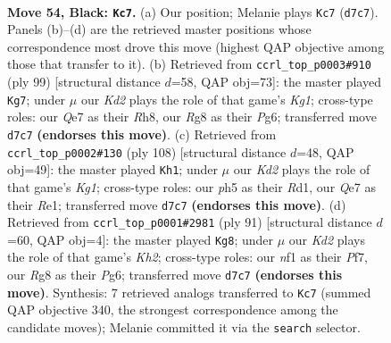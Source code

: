 \documentclass[11pt]{article}
\begin{document}
\clearpage

\begin{figure}[p]\centering
\begin{subfigure}{0.46\textwidth}\centering
\resizebox{\linewidth}{!}{%
\newchessgame
\chessboard[
  setfen={r5r1/p2kq1p1/7p/3p1Q1P/p2P2P1/4P3/7K/4bN2 b - - 17 54},
  showmover=false,
  pgfstyle=straightmove, color=movearrow, markmove={d7-c7}
]}
\caption{}
\end{subfigure}\hfill
\begin{subfigure}{0.46\textwidth}\centering
\resizebox{\linewidth}{!}{%
\newchessgame
\chessboard[
  setfen={4Q1kr/5p2/6p1/p2p4/P2P4/1P2P2q/5P2/2R3K1 b - - 7 50},
  showmover=false,
  pgfstyle=straightmove, color=movearrow, markmove={g8-g7}
]}
\caption{}
\end{subfigure}
\\[4pt]
\begin{subfigure}{0.46\textwidth}\centering
\resizebox{\linewidth}{!}{%
\newchessgame
\chessboard[
  setfen={2r3k1/5p2/6p1/1B1p3p/4n1q1/1P2P3/PQ3P2/3RR1K1 w - - 3 55},
  showmover=false,
  pgfstyle=straightmove, color=movearrow, markmove={g1-h1}
]}
\caption{}
\end{subfigure}\hfill
\begin{subfigure}{0.46\textwidth}\centering
\resizebox{\linewidth}{!}{%
\newchessgame
\chessboard[
  setfen={8/p1q2p1k/6p1/P2p3p/1Q1N4/2rbP2P/5PP1/3R3K b - - 14 46},
  showmover=false,
  pgfstyle=straightmove, color=movearrow, markmove={h7-g8}
]}
\caption{}
\end{subfigure}
\caption{\textbf{Move 54, Black: \texttt{Kc7}.} (a) Our position; Melanie plays \texttt{Kc7} (\texttt{d7c7}). Panels (b)--(d) are the retrieved master positions whose correspondence most drove this move (highest QAP objective among those that transfer to it). (b) Retrieved from \texttt{ccrl\_top\_p0003\#910} (ply 99) [structural distance $d$=58, QAP obj=73]: the master played \texttt{Kg7}; under $\mu$ our \emph{Kd2} plays the role of that game's \emph{Kg1}; cross-type roles: our \emph{Q}e7 as their \emph{R}h8, our \emph{R}g8 as their \emph{P}g6; transferred move \texttt{d7c7} \textbf{(endorses this move)}. (c) Retrieved from \texttt{ccrl\_top\_p0002\#130} (ply 108) [structural distance $d$=48, QAP obj=49]: the master played \texttt{Kh1}; under $\mu$ our \emph{Kd2} plays the role of that game's \emph{Kg1}; cross-type roles: our \emph{p}h5 as their \emph{R}d1, our \emph{Q}e7 as their \emph{R}e1; transferred move \texttt{d7c7} \textbf{(endorses this move)}. (d) Retrieved from \texttt{ccrl\_top\_p0001\#2981} (ply 91) [structural distance $d$=60, QAP obj=4]: the master played \texttt{Kg8}; under $\mu$ our \emph{Kd2} plays the role of that game's \emph{Kh2}; cross-type roles: our \emph{n}f1 as their \emph{P}f7, our \emph{R}g8 as their \emph{P}g6; transferred move \texttt{d7c7} \textbf{(endorses this move)}. Synthesis: 7 retrieved analogs transferred to \texttt{Kc7} (summed QAP objective 340, the strongest correspondence among the candidate moves); Melanie committed it via the \texttt{search} selector.}
\label{fig:thought-m107}
\end{figure}
\end{document}
